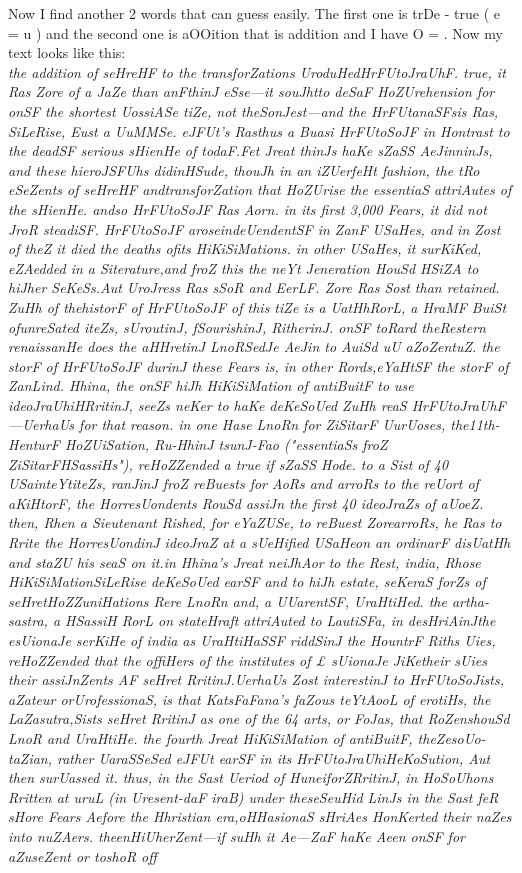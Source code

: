 \documentclass[12pt]{article}
\begin{document}
Now I find another 2 words that can guess easily. The first one is trDe - true ( e = u ) and the second one is aOOition that is addition and I have O = . Now my text looks like this:\\
\textit{the addition of seHreHF to the transforZations UroduHedHrFUtoJraUhF. true, it Ras Zore of a JaZe than anFthinJ eSse—it souJhtto deSaF HoZUrehension for onSF the shortest UossiASe tiZe, not theSonJest—and the HrFUtanaSFsis Ras, SiLeRise, Eust a UuMMSe. eJFUt's Rasthus a Buasi HrFUtoSoJF in Hontrast to the deadSF serious sHienHe of todaF.Fet Jreat thinJs haKe sZaSS AeJinninJs, and these hieroJSFUhs didinHSude, thouJh in an iZUerfeHt fashion, the tRo eSeZents of seHreHF andtransforZation that HoZUrise the essentiaS attriAutes of the sHienHe. andso HrFUtoSoJF Ras Aorn. in its first 3,000 Fears, it did not JroR steadiSF. HrFUtoSoJF aroseindeUendentSF in ZanF USaHes, and in Zost of theZ it died the deaths ofits HiKiSiMations. in other USaHes, it surKiKed, eZAedded in a Siterature,and froZ this the neYt Jeneration HouSd HSiZA to hiJher SeKeSs.Aut UroJress Ras sSoR and EerLF. Zore Ras Sost than retained. ZuHh of thehistorF of HrFUtoSoJF of this tiZe is a UatHhRorL, a HraMF BuiSt ofunreSated iteZs, sUroutinJ, fSourishinJ, RitherinJ. onSF toRard theRestern renaissanHe does the aHHretinJ LnoRSedJe AeJin to AuiSd uU aZoZentuZ. the storF of HrFUtoSoJF durinJ these Fears is, in other Rords,eYaHtSF the storF of ZanLind. Hhina, the onSF hiJh HiKiSiMation of antiBuitF to use ideoJraUhiHRritinJ, seeZs neKer to haKe deKeSoUed ZuHh reaS HrFUtoJraUhF —UerhaUs for that reason. in one Hase LnoRn for ZiSitarF UurUoses, the11th-HenturF HoZUiSation, Ru-HhinJ tsunJ-Fao ("essentiaSs froZ ZiSitarFHSassiHs"), reHoZZended a true if sZaSS Hode. to a Sist of 40 USainteYtiteZs, ranJinJ froZ reBuests for AoRs and arroRs to the reUort of aKiHtorF, the HorresUondents RouSd assiJn the first 40 ideoJraZs of aUoeZ. then, Rhen a Sieutenant Rished, for eYaZUSe, to reBuest ZorearroRs, he Ras to Rrite the HorresUondinJ ideoJraZ at a sUeHified USaHeon an ordinarF disUatHh and staZU his seaS on it.in Hhina's Jreat neiJhAor to the Rest, india, Rhose HiKiSiMationSiLeRise deKeSoUed earSF and to hiJh estate, seKeraS forZs of seHretHoZZuniHations Rere LnoRn and, a UUarentSF, UraHtiHed. the artha-sastra, a HSassiH RorL on stateHraft attriAuted to LautiSFa, in desHriAinJthe esUionaJe serKiHe of india as UraHtiHaSSF riddSinJ the HountrF Riths Uies, reHoZZended that the offiHers of the institutes of £ sUionaJe JiKetheir sUies their assiJnZents AF seHret RritinJ.UerhaUs Zost interestinJ to HrFUtoSoJists, aZateur orUrofessionaS, is that KatsFaFana's faZous teYtAooL of erotiHs, the LaZasutra,Sists seHret RritinJ as one of the 64 arts, or FoJas, that RoZenshouSd LnoR and UraHtiHe. the fourth Jreat HiKiSiMation of antiBuitF, theZesoUo-taZian, rather UaraSSeSed eJFUt earSF in its HrFUtoJraUhiHeKoSution, Aut then surUassed it. thus, in the Sast Ueriod of HuneiforZRritinJ, in HoSoUhons Rritten at uruL (in Uresent-daF iraB) under theseSeuHid LinJs in the Sast feR sHore Fears Aefore the Hhristian era,oHHasionaS sHriAes HonKerted their naZes into nuZAers. theenHiUherZent—if suHh it Ae—ZaF haKe Aeen onSF for aZuseZent or toshoR off
}\\
\end{document}
